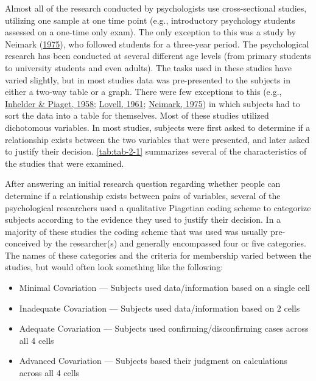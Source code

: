 \documentclass[11pt]{umnthesis}
\begin{document}
Almost all of the research conducted by psychologists use cross-sectional studies, utilizing one sample at one time point (e.g., introductory psychology students assessed on a one-time only exam). The only exception to this was a study by Neimark (\protect\hyperlink{ref-neimark:1975}{1975}), who followed students for a three-year period. The psychological research has been conducted at several different age levels (from primary students to university students and even adults). The tasks used in these studies have varied slightly, but in most studies data was pre-presented to the subjects in either a two-way table or a graph. There were few exceptions to this (e.g., \protect\hyperlink{ref-inhelder:1958}{Inhelder \& Piaget, 1958}; \protect\hyperlink{ref-lovell:1961}{Lovell, 1961}; \protect\hyperlink{ref-neimark:1975}{Neimark, 1975}) in which subjects had to sort the data into a table for themselves. Most of these studies utilized dichotomous variables. In most studies, subjects were first asked to determine if a relationship exists between the two variables that were presented, and later asked to justify their decision. \ref{tab:tab-2-1} summarizes several of the characteristics of the studies that were examined.

After answering an initial research question regarding whether people can determine if a relationship exists between pairs of variables, several of the psychological researchers used a qualitative Piagetian coding scheme to categorize subjects according to the evidence they used to justify their decision. In a majority of these studies the coding scheme that was used was usually pre-conceived by the researcher(s) and generally encompassed four or five categories. The names of these categories and the criteria for membership varied between the studies, but would often look something like the following:

\begin{itemize}
\tightlist
\item
  Minimal Covariation --- Subjects used data/information based on a single cell
\item
  Inadequate Covariation --- Subjects used data/information based on 2 cells
\item
  Adequate Covariation --- Subjects used confirming/disconfirming cases across all 4 cells
\item
  Advanced Covariation --- Subjects based their judgment on calculations across all 4 cells
\end{itemize}
\end{document}
